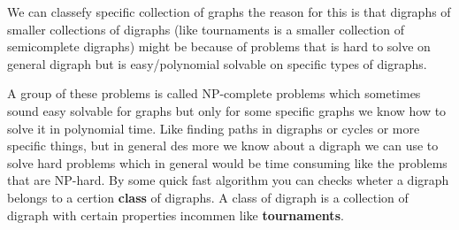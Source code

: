 We can classefy specific collection of graphs the reason for this is that digraphs of smaller collections of digraphs (like tournaments is a smaller collection of semicomplete digraphs) might be because of problems that is hard to solve on general digraph but is easy/polynomial solvable on specific types of digraphs.

A group of these problems is called NP-complete problems which sometimes sound easy solvable for graphs but only for some specific graphs we know how to solve it in polynomial time. 
Like finding paths in digraphs or cycles or more specific things, but in general des more we know about a digraph we can use to solve hard problems which in general would be time consuming like the problems that are NP-hard.
By some quick fast algorithm you can checks wheter a digraph belongs to a certion \textbf{class} of digraphs. 
A class of digraph is a collection of digraph with certain properties incommen like \textbf{tournaments}.\\
